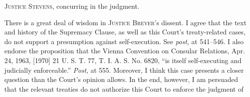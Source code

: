 
\setcounter{page}{533}

  \textsc{Justice Stevens,} concurring in the judgment.

  There is a great deal of wisdom in \textsc{Justice Breyer}'s dissent.
I agree that the text and history of the Supremacy Clause, as well
as this Court's treaty-related cases, do not support a presumption
against self-execution. See \emph{post,} at 541--546. I also endorse
the proposition that the Vienna Convention on Consular Relations,
Apr. 24, 1963, [1970] 21 U. S. T. 77, T. I. A. S. No. 6820, ``is
itself self-executing and judicially enforceable.'' \emph{Post,} at
555. Moreover, I think this case presents a closer question than the
Court's opinion allows. In the end, however, I am persuaded that the
relevant treaties do not authorize this Court to enforce the judgment of
